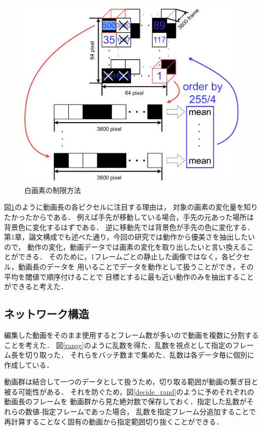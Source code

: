 \begin{figure}[t]
  \begin{center}
    \includegraphics[width=120mm]{images/chart/choice.pdf}
  \end{center}
  \caption{白画素の制限方法}
  \label{choice}
\end{figure}

図\ref{choice}のように動画長の各ピクセルに注目する理由は，
対象の画素の変化量を知りたかったからである．
例えば手先が移動している場合，手先の元あった場所は背景色に変化するはずである．
逆に移動先では背景色が手先の色に変化する．
第1章，論文構成でも述べた通り，今回の研究では動作から優美さを抽出したいので，
動作の変化，動画データでは画素の変化を取り出したいと言い換えることができる．
そのために，1フレームごとの静止した画像ではなく，各ピクセル，動画長のデータを
用いることでデータを動作として扱うことができ，その平均を閾値で順序付けることで
目標とするに最も近い動作のみを抽出することができると考えた．

\subsection{ネットワーク構造}
編集した動画をそのまま使用するとフレーム数が多いので動画を複数に分割することを考えた．
図\ref{range}のように乱数を得た．乱数を視点として指定のフレーム長を切り取った．
それらをバッチ数まで集めた．乱数は各データ毎に個別に作成している．

動画群は結合して一つのデータとして扱うため，切り取る範囲が動画の繋ぎ目と被る可能性がある．
それを防ぐため，図\ref{decide_rand}のように予めそれぞれの動画長のフレームを
動画群から見た絶対数で保存しておく．指定した乱数がそれらの数値-指定フレームであった場合，
乱数を指定フレーム分追加することで再計算することなく固有の動画から指定範囲切り抜くことができる．

